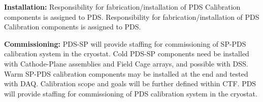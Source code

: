 \textbf{Installation: }Responsibility for fabrication/installation of PDS Calibration components is assigned to PDS. Responsibility for fabrication/installation of PDS Calibration components is assigned to PDS.

\textbf{Commissioning:} PDS-SP will provide staffing for commissioning of SP-PDS calibration system in the cryostat. Cold PDS-SP components need be installed with Cathode-Plane assemblies and Field Cage arrays, and possible with DSS. Warm SP-PDS calibration components may be installed at the end and tested with DAQ. Calibration scope and goals will be further defined within CTF. PDS will provide staffing for commissioning of PDS calibration system in the cryostat.










